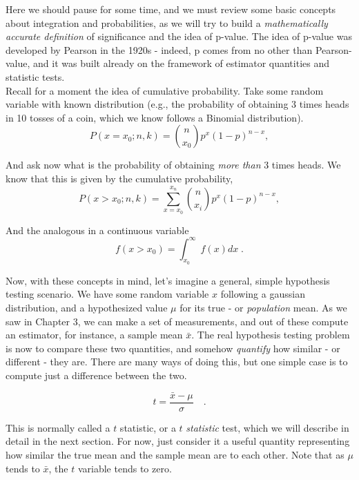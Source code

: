 \documentclass{book}
\begin{document}
Here we should pause for some time, and we must review some basic concepts about integration and probabilities, as we will try to build a \textit{mathematically accurate definition} of significance and the idea of p-value. The idea of p-value was developed by Pearson in the 1920s - indeed, p comes from no other than Pearson-value, and it was built already on the framework of estimator quantities and statistic tests.\\

Recall for a moment the idea of cumulative probability. Take some random variable with known distribution (e.g., the probability of obtaining 3 times heads in 10 tosses of a coin, which we know follows a Binomial distribution).
\begin{equation}
    P(x = x_0; n, k) = \binom{n}{x_0} p^x (1-p)^{n-x},
\end{equation}

And ask now what is the probability of obtaining \textit{more than} 3 times heads. We know that this is given by the cumulative probability, 
\begin{equation}
    P(x > x_0; n, k) = \sum_{x = x_0}^{x_n}\binom{n}{x_i} p^x (1-p)^{n-x},
\end{equation}

And the analogous in a continuous variable
\begin{equation}
    f(x > x_0) = \int_{x_0}^{\infty} \; f(x) dx \; .
\end{equation}

Now, with these concepts in mind, let's imagine a general, simple hypothesis testing scenario. We have some random variable $x$ following a gaussian distribution, and a hypothesized value $\mu$ for its true - or \textit{population} mean. As we saw in Chapter 3, we can make a set of measurements, and out of these compute an estimator, for instance, a sample mean $\bar{x}$. The real hypothesis testing problem is now to compare these two quantities, and somehow \textit{quantify} how similar - or different - they are. There are many ways of doing this, but one simple case is to compute just a difference between the two. 

\begin{equation}
	t = \frac{\bar{x} - \mu}{\sigma} \quad.
\end{equation}

This is normally called a $t$ statistic, or a $t$ \textit{statistic} test, which we will describe in detail in the next section. For now, just consider it a useful quantity representing how similar the true mean and the sample mean are to each other. Note that as $\mu$ tends to $\bar{x}$, the $t$ variable tends to zero.\\
\end{document}
